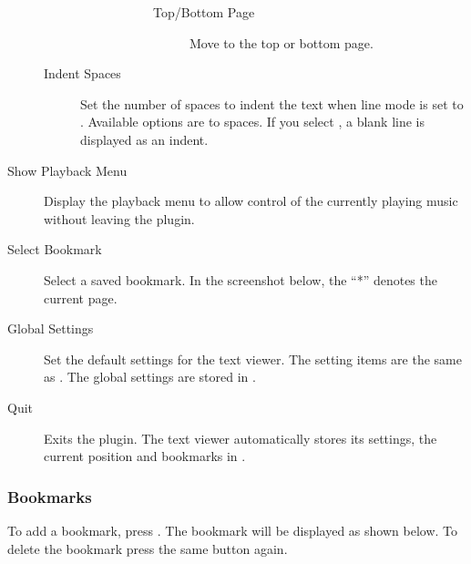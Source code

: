 \begin{description}
\begin{description}
\begin{description}
\begin{description}
\begin{description}
                        \item[Top/Bottom Page] Move to the top or bottom page.
                    \end{description}
                \end{description}
        \end{description}
    \item[Indent Spaces] Set the number of spaces to indent the text when line
      mode is set to . Available options are 
      to  spaces. If you select , a blank line is
      displayed as an indent.
    \end{description}

\item[Show Playback Menu] Display the playback menu to allow control of the
currently playing music without leaving the plugin.

\item[Select Bookmark] Select a saved bookmark. In the screenshot below, the
``*'' denotes the current page.


\item[Global Settings] Set the default settings for the text viewer.
The setting items are the same as . The global
settings are stored in
.

\item[Quit] Exits the plugin. The text viewer automatically
stores its settings, the current position and bookmarks in
.
\end{description}

\subsubsection{Bookmarks}
    To add a bookmark, press
    .
    The bookmark will be displayed as shown below. To delete the bookmark
    press the same button again.

